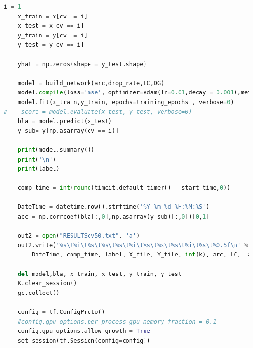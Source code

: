 \begin{lstlisting}[language=Python]
    i = 1
    x_train = x[cv != i] 
    x_test = x[cv == i] 
    y_train = y[cv != i]
    y_test = y[cv == i]

    yhat = np.zeros(shape = y_test.shape)

    model = build_network(arc,drop_rate,LC,DG)
    model.compile(loss='mse', optimizer=Adam(lr=0.01,decay = 0.001),metrics=['accuracy'])
    model.fit(x_train,y_train, epochs=training_epochs , verbose=0) 
#    score = model.evaluate(x_test, y_test, verbose=0)
    bla = model.predict(x_test)
    y_sub= y[np.asarray(cv == i)]
    
    print(model.summary())
    print('\n')
    print(label)        

    comp_time = int(round(timeit.default_timer() - start_time,0))

    DateTime = datetime.now().strftime('%Y-%m-%d %H:%M:%S')
    acc = np.corrcoef(bla[:,0],np.asarray(y_sub)[:,0])[0,1]

    out2 = open("RESULTScv50.txt", 'a')
    out2.write('%s\t%i\t%s\t%s\t%s\t%i\t%s\t%s\t%s\t%i\t%s\t%0.5f\n' % (
        DateTime, comp_time, label, X_file, Y_file, int(k), arc, LC,  act,int(training_epochs), drop_rate, round(acc,4)))

    del model,bla, x_train, x_test, y_train, y_test 
    K.clear_session() 
    gc.collect()
    
    config = tf.ConfigProto()
    #config.gpu_options.per_process_gpu_memory_fraction = 0.1
    config.gpu_options.allow_growth = True
    set_session(tf.Session(config=config))
\end{lstlisting}


